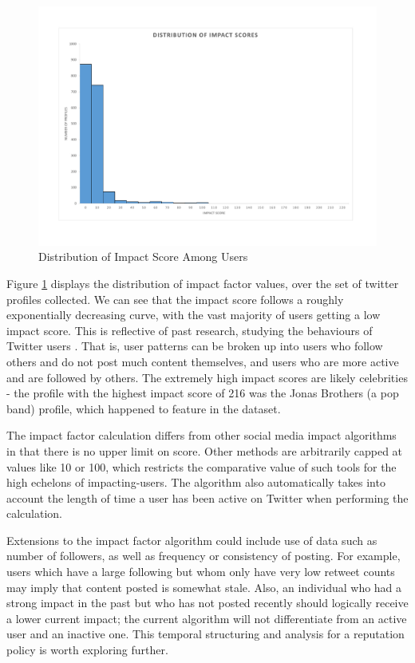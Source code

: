 \begin{figure}[h!]
\begin{center}
\centering
\includegraphics[width=500px]{Images/impact_distribution_histogram.pdf}
\caption{Distribution of Impact Score Among Users}
\label{fig:dist_impact_score}
\end{center}
\end{figure}

Figure \ref{fig:dist_impact_score} displays the distribution of impact factor values, over the set of twitter profiles collected. We can see that the impact score follows a roughly exponentially decreasing curve, with the vast majority of users getting a low impact score. This is reflective of past research, studying the behaviours of Twitter users \cite{beevolve}. That is, user patterns can be broken up into users who follow others and do not post much content themselves, and users who are more active and are followed by others. The extremely high impact scores are likely celebrities - the profile with the highest impact score of 216 was the Jonas Brothers (a pop band) profile, which happened to feature in the dataset. 

The impact factor calculation differs from other social media impact algorithms in that there is no upper limit on score. Other methods are arbitrarily capped at values like 10 or 100, which restricts the comparative value of such tools for the high echelons of impacting-users. The algorithm also automatically takes into account the length of time a user has been active on Twitter when performing the calculation. 

Extensions to the impact factor algorithm could include use of data such as number of followers, as well as frequency or consistency of posting. For example, users which have a large following but whom only have very low retweet counts may imply that content posted is somewhat stale. Also, an individual who had a strong impact in the past but who has not posted recently should logically receive a lower current impact; the current algorithm will not differentiate from an active user and an inactive one. This temporal structuring and analysis for a reputation policy is worth exploring further. 

